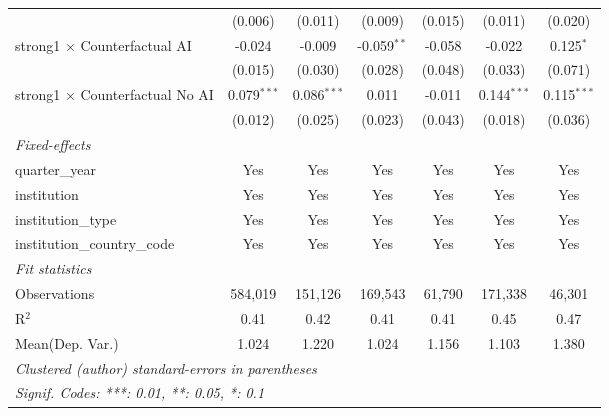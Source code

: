 \begin{tabular}{lcccccc}
                                          & (0.006)       & (0.011)       & (0.009)       & (0.015)       & (0.011)       & (0.020)\\   
   strong1 $\times$ Counterfactual AI     & -0.024        & -0.009        & -0.059$^{**}$ & -0.058        & -0.022        & 0.125$^{*}$\\   
                                          & (0.015)       & (0.030)       & (0.028)       & (0.048)       & (0.033)       & (0.071)\\   
   strong1 $\times$ Counterfactual No AI  & 0.079$^{***}$ & 0.086$^{***}$ & 0.011         & -0.011        & 0.144$^{***}$ & 0.115$^{***}$\\   
                                          & (0.012)       & (0.025)       & (0.023)       & (0.043)       & (0.018)       & (0.036)\\   
   \midrule
   \emph{Fixed-effects}\\
   quarter\_year                          & Yes           & Yes           & Yes           & Yes           & Yes           & Yes\\  
   institution                            & Yes           & Yes           & Yes           & Yes           & Yes           & Yes\\  
   institution\_type                      & Yes           & Yes           & Yes           & Yes           & Yes           & Yes\\  
   institution\_country\_code             & Yes           & Yes           & Yes           & Yes           & Yes           & Yes\\  
   \midrule
   \emph{Fit statistics}\\
   Observations                           & 584,019       & 151,126       & 169,543       & 61,790        & 171,338       & 46,301\\  
   R$^2$                                  & 0.41          & 0.42          & 0.41          & 0.41          & 0.45          & 0.47\\  
Mean(Dep. Var.) & 1.024 & 1.220 & 1.024 & 1.156 & 1.103 & 1.380 \\
   \midrule \midrule
   \multicolumn{7}{l}{\emph{Clustered (author) standard-errors in parentheses}}\\
   \multicolumn{7}{l}{\emph{Signif. Codes: ***: 0.01, **: 0.05, *: 0.1}}\\
\end{tabular}
\par\endgroup
